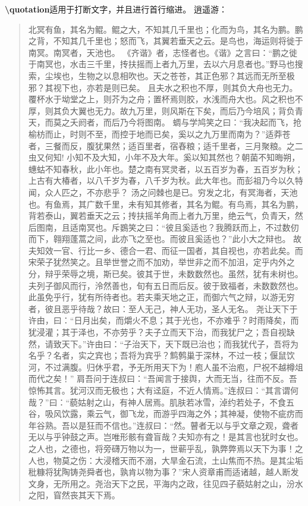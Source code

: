 \documentclass[utf8]{book}
\newcommand{\latexcommand}[1]{\textbf{\textbackslash #1}}
\begin{document}
		\latexcommand{quotation}适用于打断文字，并且进行首行缩进。
		逍遥游：
		\begin{quotation}
			北冥有鱼，其名为鲲。鲲之大，不知其几千里也；化而为鸟，其名为鹏。鹏之背，不知其几千里也；怒而飞，其翼若垂天之云。是鸟也，海运则将徙于南冥。南冥者，天池也。
			《齐谐》者，志怪者也。《谐》之言曰：“鹏之徙于南冥也，水击三千里，抟扶摇而上者九万里，去以六月息者也。”野马也搜索，尘埃也，生物之以息相吹也。天之苍苍，其正色邪？其远而无所至极邪？其视下也，亦若是则已矣。
			且夫水之积也不厚，则其负大舟也无力。覆杯水于坳堂之上，则芥为之舟；置杯焉则胶，水浅而舟大也。风之积也不厚，则其负大翼也无力。故九万里，则风斯在下矣，而后乃今培风；背负青天，而莫之夭阏者，而后乃今将图南。
			蜩与学鸠笑之曰：“我决起而飞，抢榆枋而止，时则不至，而控于地而已矣，奚以之九万里而南为？”适莽苍者，三餐而反，腹犹果然；适百里者，宿舂粮；适千里者，三月聚粮。之二虫又何知!
			小知不及大知，小年不及大年。奚以知其然也？朝菌不知晦朔，蟪蛄不知春秋，此小年也。楚之南有冥灵者，以五百岁为春，五百岁为秋；上古有大椿者，以八千岁为春，八千岁为秋。此大年也。而彭祖乃今以久特闻，众人匹之，不亦悲乎？
			汤之问棘也是已。穷发之北，有冥海者，天池也。有鱼焉，其广数千里，未有知其修者，其名为鲲。有鸟焉，其名为鹏，背若泰山，翼若垂天之云；抟扶摇羊角而上者九万里，绝云气，负青天，然后图南，且适南冥也。斥鷃笑之曰：“彼且奚适也？我腾跃而上，不过数仞而下，翱翔蓬蒿之间，此亦飞之至也。而彼且奚适也？”此小大之辩也。
			故夫知效一官、行比一乡、德合一君、而征一国者，其自视也，亦若此矣。而宋荣子犹然笑之。且举世誉之而不加劝，举世非之而不加沮，定乎内外之分，辩乎荣辱之境，斯已矣。彼其于世，未数数然也。虽然，犹有未树也。夫列子御风而行，泠然善也，旬有五日而后反。彼于致福者，未数数然也。此虽免乎行，犹有所待者也。若夫乘天地之正，而御六气之辩，以游无穷者，彼且恶乎待哉？故曰：至人无己，神人无功，圣人无名。
			尧让天下于许由，曰：“日月出矣，而爝火不息；其于光也，不亦难乎？时雨降矣，而犹浸灌；其于泽也，不亦劳乎？夫子立而天下治，而我犹尸之；吾自视缺然，请致天下。”许由曰：“子治天下，天下既已治也；而我犹代子，吾将为名乎？名者，实之宾也；吾将为宾乎？鹪鹩巢于深林，不过一枝；偃鼠饮河，不过满腹。归休乎君，予无所用天下为！庖人虽不治庖，尸祝不越樽俎而代之矣！”
			肩吾问于连叔曰：“吾闻言于接舆，大而无当，往而不反。吾惊怖其言。犹河汉而无极也；大有迳庭，不近人情焉。”连叔曰：“其言谓何哉？”曰：“藐姑射之山，有神人居焉。肌肤若冰雪，淖约若处子，不食五谷，吸风饮露，乘云气，御飞龙，而游乎四海之外；其神凝，使物不疵疠而年谷熟。吾以是狂而不信也。”连叔曰：“然。瞽者无以与乎文章之观，聋者无以与乎钟鼓之声。岂唯形骸有聋盲哉？夫知亦有之！是其言也犹时女也。之人也，之德也，将旁礴万物以为一，世蕲乎乱，孰弊弊焉以天下为事！之人也，物莫之伤：大浸稽天而不溺，大旱金石流，土山焦而不热。是其尘垢秕糠将犹陶铸尧舜者也，孰肯以物为事？”宋人资章甫而适诸越，越人断发文身，无所用之。尧治天下之民，平海内之政，往见四子藐姑射之山，汾水之阳，窅然丧其天下焉。

\end{quotation}
\end{document}
